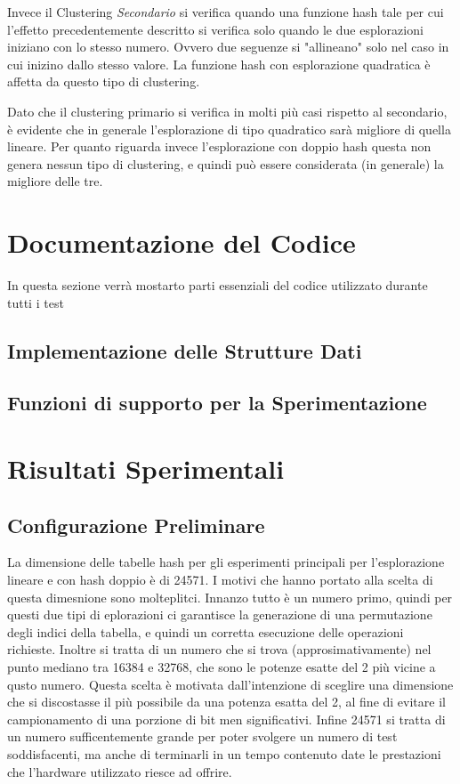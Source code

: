 \documentclass{article}
\begin{document}
Invece il Clustering \emph{Secondario} si verifica quando una funzione hash tale per cui l'effetto precedentemente descritto si verifica solo quando le due esplorazioni iniziano con lo stesso numero. Ovvero due seguenze si "allineano" solo nel caso in cui inizino dallo stesso valore. La funzione hash con esplorazione quadratica è affetta da questo tipo di clustering.

Dato che il clustering primario si verifica in molti più casi rispetto al secondario, è evidente che in generale l'esplorazione di tipo quadratico sarà migliore di quella lineare. Per quanto riguarda invece l'esplorazione con doppio hash questa non genera nessun tipo di clustering, e quindi può essere considerata (in generale) la migliore delle tre.

\section{Documentazione del Codice}
In questa sezione verrà mostarto parti essenziali del codice utilizzato durante tutti i test
\subsection{Implementazione delle Strutture Dati}


\subsection{Funzioni di supporto per la Sperimentazione}

\section{Risultati Sperimentali}

\subsection{Configurazione Preliminare}

La dimensione delle tabelle hash per gli esperimenti principali per l'esplorazione lineare e con hash doppio è di 24571. I motivi che hanno portato alla scelta di questa dimesnione sono molteplitci. Innanzo tutto è un numero primo, quindi per questi due tipi di eplorazioni ci garantisce la generazione di una permutazione degli indici della tabella, e quindi un corretta esecuzione delle operazioni richieste. Inoltre si tratta di un numero che si trova (approsimativamente) nel punto mediano tra 16384 e 32768, che sono le potenze esatte del 2 più vicine a qusto numero. Questa scelta è motivata dall'intenzione di sceglire una dimensione che si discostasse il più possibile da una potenza esatta del 2, al fine di evitare il campionamento di una porzione di bit men significativi. Infine 24571 si tratta di un numero sufficentemente grande per poter svolgere un numero di test soddisfacenti, ma anche di terminarli in un tempo contenuto date le prestazioni che l'hardware utilizzato riesce ad offrire.
\end{document}
